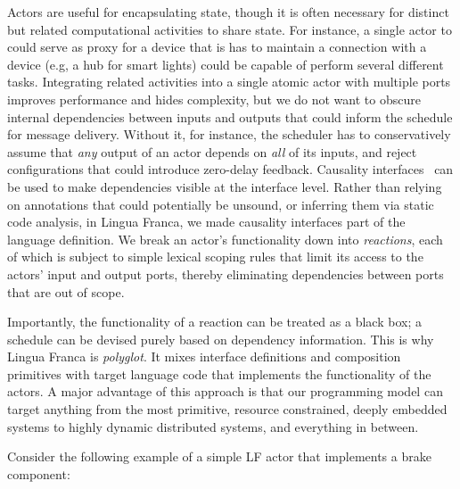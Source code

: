 \documentclass[sigconf]{acmart}
\begin{document}
Actors are useful for encapsulating state, though it is often necessary for distinct but related computational activities to share state. For instance, a single actor to could serve as proxy for a device that is has to maintain a connection with a device (e.g, a hub for smart lights) could be capable of perform several different tasks.
Integrating related activities into a single atomic actor with multiple ports improves performance and hides complexity, but we do not want to obscure internal dependencies between inputs and outputs that could inform the schedule for message delivery. Without it, for instance, the scheduler has to conservatively assume that \emph{any} output of an actor depends on \emph{all} of its inputs, and reject configurations that could introduce zero-delay feedback. Causality interfaces~\cite{ZhouLee:08:CausalityInterfaces} can be used to make dependencies visible at the interface level. Rather than relying on annotations that could potentially be unsound, or inferring them via static code analysis, in Lingua Franca, we made causality interfaces part of the language definition. We break an actor's functionality down into \emph{reactions}, each of which is subject to simple lexical scoping rules that limit its access to the actors' input and output ports, thereby eliminating dependencies between ports that are out of scope. 

Importantly, the functionality of a reaction can be treated as a black box; a schedule can be devised purely based on dependency information. This is why Lingua Franca is \emph{polyglot}. It mixes interface definitions and composition primitives with target language code that implements the functionality of the actors. A major advantage of this approach is that our programming model can target anything from the most primitive, resource constrained, deeply embedded systems to highly dynamic distributed systems, and everything in between.

Consider the following example of a simple LF actor that implements a brake component:

\end{document}
